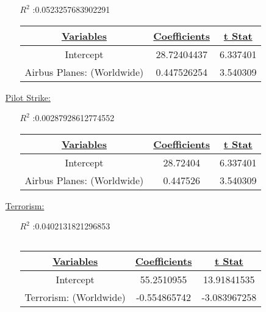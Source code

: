 \documentclass[12pt]{report}
\begin{document}
\begin{enumerate}
\begin{samepage}
        \begin{enumerate}
            \item[$R^2$]:0.0523257683902291
            \item[]
                \begin{tabular}{|c|c|c|}
                    \toprule
                    \hline
                    \underline{Variables} & \underline{Coefficients} & \underline{t Stat}\\ \hline
                    Intercept & 28.72404437 & 6.337401 \\ \hline
                    Airbus Planes: (Worldwide) & 0.447526254 & 3.540309 \\ \hline
                    \bottomrule
                \end{tabular}

        \end{enumerate}
\end{samepage}
    \item[\underline{Pilot Strike:}]
 \begin{samepage}


        \begin{enumerate}
            \item[$R^2$]:0.00287928612774552
            \item[]
                \begin{tabular}{|c|c|c|}
                    \toprule
                    \hline
                    \underline{Variables} & \underline{Coefficients} & \underline{t Stat}\\ \hline
                    Intercept & 28.72404 & 6.337401 \\
                    \hline
                    Airbus Planes: (Worldwide) & 0.447526 & 3.540309 \\
                    \hline
                    \bottomrule
                \end{tabular}

        \end{enumerate}
\end{samepage}

    \item[\underline{Terrorism:}]
        \begin{enumerate}
            \item[$R^2$]:0.0402131821296853
        \item[$$]\begin{tabular}{|c|c|c|}
                    \toprule
                    \hline
                    \underline{Variables} & \underline{Coefficients} & \underline{t Stat}\\
                    \hline
                    Intercept & 55.2510955 & 13.91841535 \\
                    \hline
                    Terrorism: (Worldwide) & -0.554865742 & -3.083967258 \\
                    \hline
                    \bottomrule
                \end{tabular}


\end{enumerate}
\end{enumerate}
\end{document}
